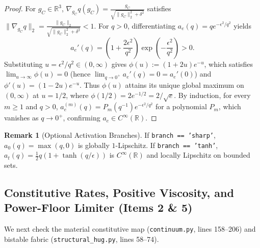 \documentclass[11pt,a4paper]{article}
\theoremstyle{definition}
\newtheorem{remark}[theorem]{Remark}
\begin{document}
\begin{proof}
For $g_C \in \mathbb{R}^3$, $\nabla_{g_C} q(g_C) = \frac{g_C}{\sqrt{\|g_C\|_2^2 + \delta^2}}$ satisfies $\|\nabla_{g_C} q\|_2 = \frac{\|g_C\|_2}{\sqrt{\|g_C\|_2^2 + \delta^2}} < 1$. For $q > 0$, differentiating $a_e(q) = q e^{-\epsilon^2/q^2}$ yields
\begin{equation}
  a_e'(q) = \left(1 + \frac{2\epsilon^2}{q^2}\right)\exp\!\left(-\frac{\epsilon^2}{q^2}\right) > 0.
\end{equation}
Substituting $u = \epsilon^2/q^2 \in (0, \infty)$ gives $\phi(u) := (1 + 2u)e^{-u}$, which satisfies $\lim_{u \to \infty} \phi(u) = 0$ (hence $\lim_{q \to 0^+} a_e'(q) = 0 = a_e'(0)$) and $\phi'(u) = (1 - 2u)e^{-u}$. Thus $\phi(u)$ attains its unique global maximum on $(0, \infty)$ at $u = 1/2$, where $\phi(1/2) = 2e^{-1/2} = 2/\sqrt{e}$. By induction, for every $m \ge 1$ and $q > 0$, $a_e^{(m)}(q) = P_m(q^{-1})e^{-\epsilon^2/q^2}$ for a polynomial $P_m$, which vanishes as $q \to 0^+$, confirming $a_e \in C^\infty(\mathbb{R})$.
\end{proof}

\begin{remark}[Optional Activation Branches]
If \texttt{branch == 'sharp'}, $a_0(q) = \max(q, 0)$ is globally $1$-Lipschitz. If \texttt{branch == 'tanh'}, $a_t(q) = \frac{1}{2}q(1 + \tanh(q/\epsilon))$ is $C^\infty(\mathbb{R})$ and locally Lipschitz on bounded sets.
\end{remark}

\subsection{Constitutive Rates, Positive Viscosity, and Power-Floor Limiter (Items 2 \& 5)}

We next check the material constitutive map (\texttt{continuum.py}, lines 158--206) and bistable fabric (\texttt{structural\_hug.py}, lines 58--74).
\end{document}
